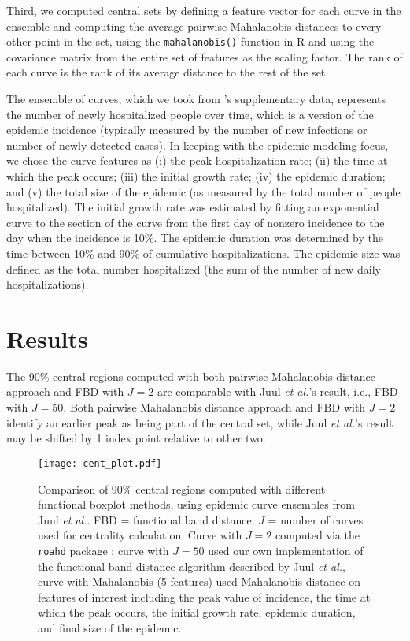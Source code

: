 \documentclass[fleqn,10pt,lineno]{wlpeerj}
\newcommand{\juul}{Juul \emph{et al.}\xspace}  %
\begin{document}
Third, we computed central sets by defining a feature vector for each curve in the ensemble and computing the average pairwise Mahalanobis distances to every other point in the set, using the {\tt mahalanobis()} function in R and using the covariance matrix from the entire  set of features as the scaling factor. The rank of each curve is the rank of its average distance to the rest of the set.

The ensemble of curves, which we took from \cite{juul2021fixed}'s supplementary data, represents the number of newly hospitalized people over time, which is a version of the epidemic incidence (typically measured by the number of new infections or number of newly detected cases).
In keeping with the epidemic-modeling focus, we chose the curve features as (i) the peak
hospitalization rate; (ii) the time at which the peak occurs; (iii) the initial growth rate; (iv) the epidemic duration; and (v) the total size of the epidemic (as measured by the total number of people hospitalized). The initial growth rate was estimated by fitting an exponential curve to the section of the curve from the first day of nonzero incidence to the day when the incidence is 10\%. The epidemic duration was determined by the time between 10\% and 90\% of cumulative hospitalizations. The epidemic size was defined as the total number hospitalized (the sum of the number of new daily hospitalizations).

\section*{Results}

The 90\% central regions computed with both pairwise Mahalanobis distance approach and FBD with $J=2$ are comparable with \juul's result, i.e., FBD with $J=50$. Both pairwise Mahalanobis distance approach and FBD with $J=2$ identify an earlier peak as being part of the central set, while \juul's result may be shifted by 1 index point relative to other two.

\begin{figure}[ht]\centering
  \texttt{[image: cent\_plot.pdf]}
  \caption{Comparison of 90\% central regions computed with
    different functional boxplot methods, using epidemic curve ensembles from \juul. FBD = functional band distance; $J$ = number of curves used for centrality calculation. Curve with $J=2$ computed via the \texttt{roahd} package \citep{roahd}: curve with $J=50$ used our own implementation of the functional band distance algorithm described by \juul, curve with Mahalanobis (5 features) used Mahalanobis distance on features of interest including the peak value of incidence, the time at which the peak occurs, the initial growth rate, epidemic duration, and final size of the epidemic.
  }
  \label{p.a}
\end{figure}
 
\end{document}
